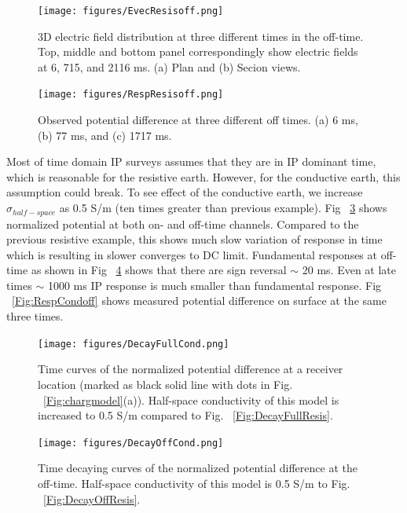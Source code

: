 \documentclass[letterpaper,11pt]{article}
\begin{document}
\begin{figure}[htb]
  \centering
  \texttt{[image: figures/EvecResisoff.png]}
  \caption{3D electric field distribution at three different times in the off-time. Top, middle and bottom panel correspondingly show electric fields at 6, 715, and 2116 ms. (a) Plan and (b) Secion views.}
  \label{Fig:EvecResisoff}
\end{figure}

\begin{figure}[htb]
  \centering
  \texttt{[image: figures/RespResisoff.png]}
  \caption{Observed potential difference at three different off times. (a) 6 ms, (b) 77 ms, and (c) 1717 ms. }
  \label{Fig:RespResisoff}
\end{figure}

Most of time domain IP surveys assumes that they are in IP dominant time, which is reasonable for the resistive earth. 
However, for the conductive earth, this assumption could break. To see effect of the conductive earth, we increase $\sigma_{half-space}$ as 0.5 S/m (ten times greater than previous example). Fig ~\ref{Fig:DecayFullCond} shows normalized potential at both on- and off-time channels. Compared to the previous resistive example, this shows much slow variation of response in time which is resulting in slower converges to DC limit. Fundamental responses at off-time as shown in Fig ~\ref{Fig:DecayOffCond} shows that there are sign reversal $\sim$ 20 ms. Even at late times $\sim$ 1000 ms IP response is much smaller than fundamental response. Fig ~\ref{Fig:RespCondoff} shows measured potential difference on surface at the same three times. 

\begin{figure}[htb]
  \centering
  \texttt{[image: figures/DecayFullCond.png]}
  \caption{Time curves of the normalized potential difference at a receiver location (marked as black solid line with dots in Fig. ~\ref{Fig:chargmodel}(a)). Half-space conductivity of this model is increased to 0.5 S/m compared to Fig. ~\ref{Fig:DecayFullResis}.}
  \label{Fig:DecayFullCond}
\end{figure}

\begin{figure}[htb]
  \centering
  \texttt{[image: figures/DecayOffCond.png]}
  \caption{Time decaying curves of the normalized potential difference at the off-time. Half-space conductivity of this model is 0.5 S/m to Fig. ~\ref{Fig:DecayOffResis}.}
  \label{Fig:DecayOffCond}
\end{figure}
\end{document}
